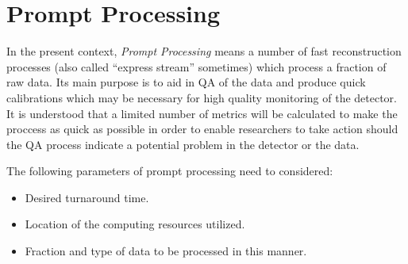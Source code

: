 \section{Prompt Processing}
In the present context, \textit{Prompt Processing} means a number of fast reconstruction processes (also called
``express stream'' sometimes) which process a fraction of raw data. Its main purpose is to aid in QA of the data
and produce quick calibrations which may be necessary for high quality monitoring of the detector. It is understood
that a limited number of metrics will be calculated to make the proccess as quick as possible in order to enable
researchers to take action should the QA process indicate a potential problem in the detector or the data.

The following parameters of prompt processing need to considered:
\begin{itemize}
\item Desired turnaround time.
\item Location of the computing resources utilized.
\item Fraction and type of data to be processed in this manner.
\end{itemize}

